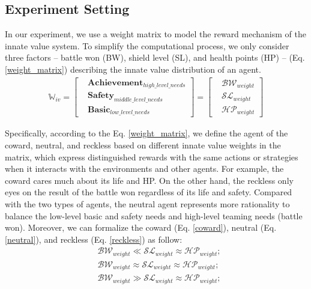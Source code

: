 \documentclass[letterpaper]{article} %
\begin{document}
\subsection{Experiment Setting}

In our experiment, we use a weight matrix to model the reward mechanism of the innate value system. To simplify the computational process, we only consider three factors -- battle won (BW), shield level (SL), and health points (HP) -- (Eq. \eqref{weight_matrix}) describing the innate value distribution of an agent.
\begin{equation}
\begin{split}
    \mathbb{W}_{iv} = \left [ 
    \begin{aligned}
    & \mathbf{Achievement}_{high\_level\_needs} \\
    & \mathbf{Safety}_{middle\_level\_needs} \\
    & \mathbf{Basic}_{low\_level\_needs}
    \end{aligned}
    \right ] = 
    \left [ 
    \begin{aligned}
    & \mathcal{BW}_{weight} \\
    & \mathcal{SL}_{weight}  \\
    & \mathcal{HP}_{weight}
    \end{aligned}
    \right ]
\label{weight_matrix}
\end{split}
\end{equation}

Specifically, according to the Eq. \eqref{weight_matrix}, we define the agent of the coward, neutral, and reckless based on different innate value weights in the matrix, which express distinguished rewards with the same actions or strategies when it interacts with the environments and other agents. For example, the coward cares much about its life and HP. On the other hand, the reckless only eyes on the result of the battle won regardless of its life and safety. Compared with the two types of agents, the neutral agent represents more rationality to balance the low-level basic and safety needs and high-level teaming needs (battle won). Moreover, we can formalize the coward (Eq. \eqref{coward}), neutral (Eq. \eqref{neutral}), and reckless (Eq. \eqref{reckless}) as follow:
\begin{eqnarray}
    & \mathcal{BW}_{weight} \ll \mathcal{SL}_{weight} \approx \mathcal{HP}_{weight}; \label{coward} \\
    & \mathcal{BW}_{weight} \approx \mathcal{SL}_{weight} \approx \mathcal{HP}_{weight}; \label{neutral} \\
    & \mathcal{BW}_{weight} \gg \mathcal{SL}_{weight} \approx \mathcal{HP}_{weight}; \label{reckless}
\end{eqnarray}
\end{document}
